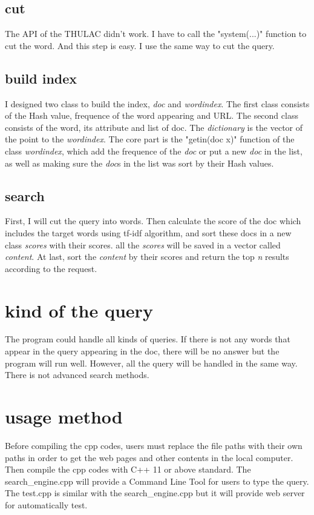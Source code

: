 \documentclass[a4paper]{article}
\begin{document}
\subsection{cut}
The API of the THULAC didn't work. I have to call the "system(...)" function to cut the word. And this step is easy. I use the same way to cut the query.

\subsection{build index}
I designed two class to build the index, \emph{doc} and \emph{wordindex}. The first class consists of the Hash value, frequence of the word appearing and URL. The second class consists of the word, its attribute and list of doc. The \emph{dictionary} is the vector of the point to the \emph{wordindex}. The core part is the "getin(doc x)" function of the class \emph{wordindex}, which add the frequence of the \emph{doc} or put a new \emph{doc} in the list, as well as making sure the \emph{doc}s in the list was sort by their Hash values.

 \subsection{search}
 First, I will cut the query into words. Then calculate the score of the doc which includes the target words using tf-idf algorithm, and sort these docs in a new class \emph{scores} with their scores. all the \emph{scores} will be saved in a vector called \emph{content}. At last, sort the \emph{content} by their scores and return the top \emph{n} results according to the request.
 
 \section{kind of the query}
 The program could handle all kinds of queries. If there is not any words that appear in the query appearing in the doc, there will be no answer but the program will run well. However, all the query will be handled in the same way. There is not advanced search methods.
 
\section{usage method}
 Before compiling the cpp codes, users must replace the file paths with their own paths in order to get the web pages and other contents in the local computer. Then compile the cpp codes with C++ 11 or above standard. The search\_engine.cpp will provide a Command Line Tool for users to type the query. The test.cpp is similar with the search\_engine.cpp but it will provide web server for automatically test.
 
\end{document}
